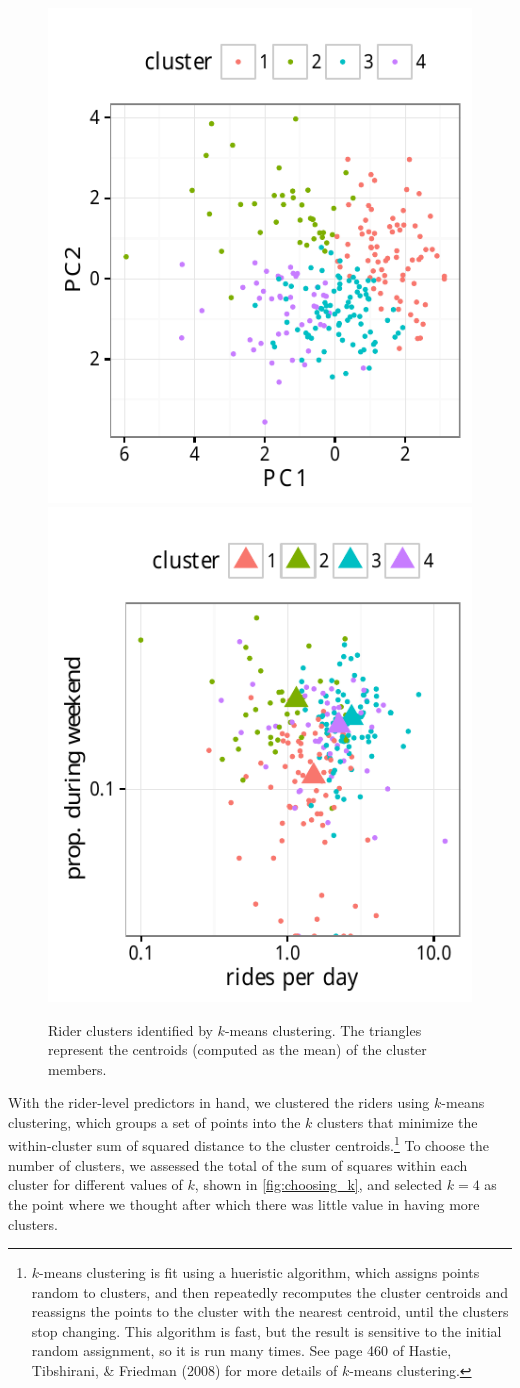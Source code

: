 \documentclass[12pt,twoside]{reedthesis}
\begin{document}
  \begin{figure}[htb]
  \centering
  \includegraphics[width=.5\textwidth]{figure/cluster_scatter1.pdf}\hfill
  \includegraphics[width=.5\textwidth]{figure/cluster_scatter3.pdf}
  \caption[Rider clusters identified by $k$-means clustering]{
  Rider clusters identified by $k$-means clustering. The triangles represent
  the centroids (computed as the mean) of the cluster members. \label{fig:cluster-scatter}}
  \end{figure}
  
  With the rider-level predictors in hand, we clustered the riders using
  \(k\)-means clustering, which groups a set of points into the \(k\)
  clusters that minimize the within-cluster sum of squared distance to the
  cluster centroids.\footnote{\(k\)-means clustering is fit using a
    hueristic algorithm, which assigns points random to clusters, and then
    repeatedly recomputes the cluster centroids and reassigns the points
    to the cluster with the nearest centroid, until the clusters stop
    changing. This algorithm is fast, but the result is sensitive to the
    initial random assignment, so it is run many times. See page 460 of
    Hastie, Tibshirani, \& Friedman (2008) for more details of \(k\)-means
    clustering.} To choose the number of clusters, we assessed the total
  of the sum of squares within each cluster for different values of \(k\),
  shown in \autoref{fig:choosing_k}, and selected \(k = 4\) as the point
  where we thought after which there was little value in having more
  clusters.
  
\end{document}
